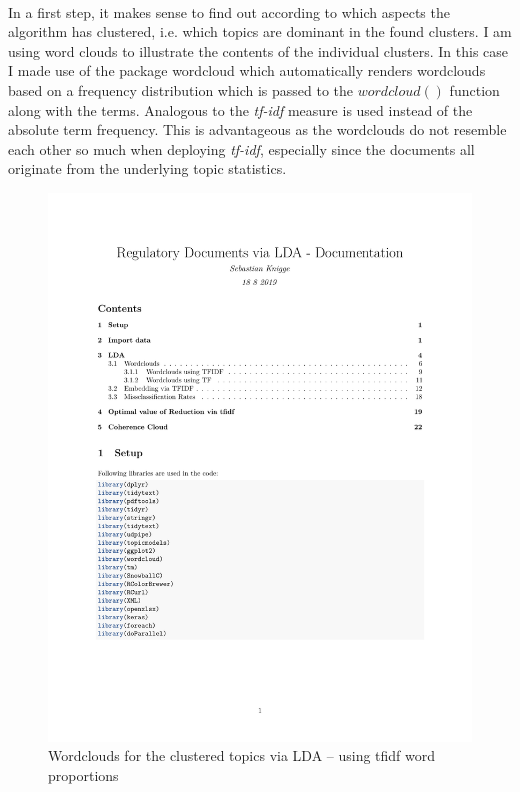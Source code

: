 \documentclass[11pt,a4paper]{article}
\begin{document}
\ \\
In a first step, it makes sense to find out according to which aspects the algorithm has clustered, i.e. which topics are dominant in the found clusters. I am using word clouds to illustrate the contents of the individual clusters. In this case I made use of the package wordcloud which automatically renders wordclouds based on a frequency distribution which is passed to the $wordcloud()$ function along with the terms. Analogous to \cite{Winter2017} the \textit{tf-idf} measure is used instead of the absolute term frequency. This is advantageous as the wordclouds do not resemble each other so much when deploying \textit{tf-idf}, especially since the documents all originate from the underlying topic statistics.\\
\begin{figure}[h]
	\centering
	\includegraphics[page=10, trim=68 440 10 50,clip,width=1.2\textwidth]{Docs_LDA_adapted.pdf}
	\caption{Wordclouds for the clustered topics via LDA – using tfidf word proportions}
	\label{Wordclouds_tfidf}
\end{figure}
\end{document}
